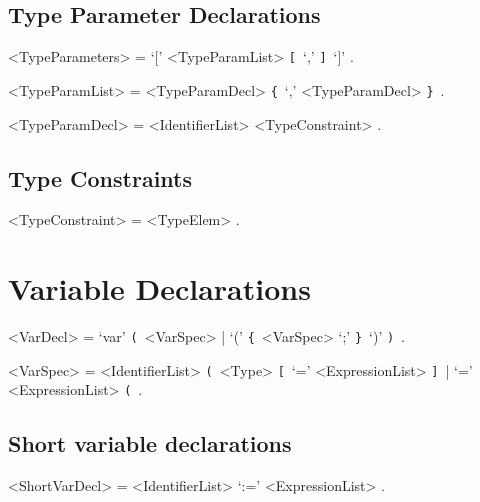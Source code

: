 \documentclass{article}
\def\lrep{\synshortsoff\texttt{\{}\synshorts~}
\def\rrep{\synshortsoff\texttt{\}}\synshorts~}
\def\lopt{\synshortsoff\texttt{[}\synshorts~}
\def\ropt{\synshortsoff\texttt{]}\synshorts~}
\def\lgrp{\synshortsoff\texttt{(}\synshorts~}
\def\rgrp{\synshortsoff\texttt{)}\synshorts~}
\begin{document}
\subsection*{Type Parameter Declarations}
\begin{grammar} 
	<TypeParameters> = `[' <TypeParamList> \lopt 	`,' \ropt `]' . 

	<TypeParamList> = <TypeParamDecl> \lrep `,' <TypeParamDecl> \rrep .
	
	<TypeParamDecl> = <IdentifierList> <TypeConstraint> . 
\end{grammar} 

\subsection*{Type Constraints}
\begin{grammar} 
	<TypeConstraint> = <TypeElem> .
\end{grammar} 

\section*{Variable Declarations} 
\begin{grammar} 
	<VarDecl> = `var' \lgrp <VarSpec> | `(' \lrep <VarSpec> `;' \rrep `)' \rgrp .

	<VarSpec> = <IdentifierList> \lgrp <Type> \lopt `=' <ExpressionList> \ropt | `=' <ExpressionList> \lgrp .
\end{grammar}

\subsection*{Short variable declarations}
\begin{grammar} 
	<ShortVarDecl> = <IdentifierList> `:=' <ExpressionList> .
\end{grammar}
\end{document}
